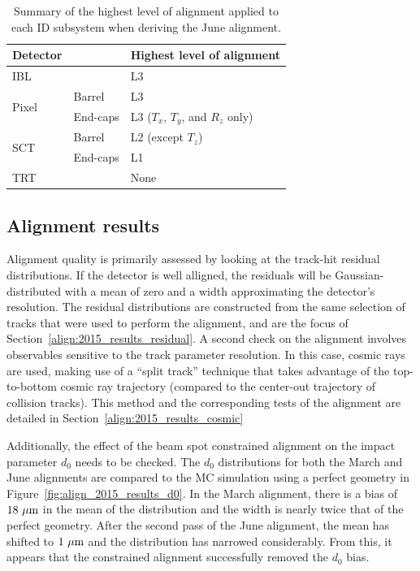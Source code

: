 \begin{table}[htbp]
  \centering
  \begin{tabular}{l l | l}
    Detector & & Highest level of alignment\\
    \hline\hline
    IBL && L3 \\
    \hline
    \multirow{2}{*}{Pixel} & Barrel & L3 \\
                           & End-caps & L3 ($T_x$, $T_y$, and $R_z$ only) \\
    \hline
    \multirow{2}{*}{SCT} & Barrel & L2 (except $T_z$) \\
                           & End-caps & L1 \\
    \hline
    TRT && None\\
    \hline
  \end{tabular} 
  \caption{Summary of the highest level of alignment applied to each ID subsystem when deriving the June alignment.}
  \label{tab:align_june_levels}
\end{table}

\subsection{Alignment results}
Alignment quality is primarily assessed by looking at the track-hit residual distributions.
If the detector is well alligned, the residuals will be Gaussian-distributed with a mean of zero and a width approximating the detector's resolution.
The residual distributions are constructed from the same selection of tracks that were used to perform the alignment, and are the focus of Section~\ref{align:2015_results_residual}.
A second check on the alignment involves observables sensitive to the track parameter resolution.
In this case, cosmic rays are used, making use of a ``split track'' technique that takes advantage of the top-to-bottom cosmic ray trajectory (compared to the center-out trajectory of collision tracks).
This method and the corresponding tests of the alignment are detailed in Section~\ref{align:2015_results_cosmic}

Additionally, the effect of the beam spot constrained alignment on the impact parameter $d_0$ needs to be checked.
The $d_0$ distributions for both the March and June alignments are compared to the MC simulation using a perfect geometry in Figure~\ref{fig:align_2015_results_d0}.
In the March alignment, there is a bias of $18~\mu\textrm{m}$ in the mean of the distribution and the width is nearly twice that of the perfect geometry.
After the second pass of the June alignment, the mean has shifted to $1~\mu\textrm{m}$ and the distribution has narrowed considerably.
From this, it appears that the constrained alignment successfully removed the $d_0$ bias.

